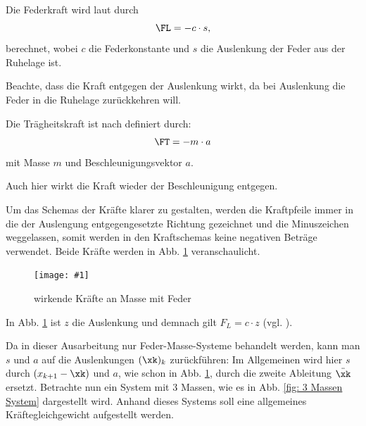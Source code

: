 \documentclass[a4paper,12pt]{report}
\newcommand{\bild}[4]{
      \begin{figure}[!htp]
            \centering
            \texttt{[image: \#1]}
            \caption{#3}
            #4
      \end{figure}
}
\newcommand{\1}{\mathds{1}}
\theoremstyle{plain} %
\theoremstyle{definition} %
\theoremstyle{remark}
\begin{document}
            Die Federkraft \FL wird laut \cite{federkraft} durch
            \begin{equation}
                  \label{eqn: Federkraft}
                  \FL = -c\cdot s,
            \end{equation}
            berechnet, wobei $c$ die Federkonstante und $s$ die Auslenkung der Feder aus der Ruhelage ist.

            Beachte, dass die Kraft entgegen der Auslenkung wirkt, da bei Auslenkung die Feder in die Ruhelage zurückkehren will.
                  
            Die Trägheitskraft \FT ist nach \cite{trägheitskraft} definiert durch:
            \begin{equation}
                  \label{eqn: Trägheitskraft}
                  \FT = -m\cdot a
            \end{equation}
            mit Masse $m$ und Beschleunigungsvektor $a$.    
            
            Auch hier wirkt die Kraft wieder der Beschleunigung entgegen.

            Um das Schemas der Kräfte klarer zu gestalten, werden die Kraftpfeile immer in die der Auslengung entgegengesetzte Richtung gezeichnet und die Minuszeichen weggelassen,
            somit werden in den Kraftschemas keine negativen Beträge verwendet.
            Beide Kräfte werden in Abb. \ref{fig: KräfteAnFeder} veranschaulicht.

            \bild{Federkraft und Trägheitskraft.png}{0.3}{wirkende Kräfte an Masse mit Feder}{\label{fig: KräfteAnFeder}}

            In Abb. \ref{fig: KräfteAnFeder} ist $z$ die Auslenkung und demnach gilt $F_L = c\cdot z$ (vgl. \cite{federkraft}).

            Da in dieser Ausarbeitung nur Feder-Masse-Systeme behandelt werden, kann man $s$ und $a$ auf die Auslenkungen $(\xk)_k$ zurückführen:
            Im Allgemeinen wird hier $s$ durch $(x_{k+1}-\xk)$ und $a$, wie schon in Abb. \ref{fig: KräfteAnFeder}, durch die zweite Ableitung $\ddot \xk$ ersetzt.
            Betrachte nun ein System mit 3 Massen, wie es in Abb. \ref{fig: 3 Massen System} dargestellt wird.
            Anhand dieses Systems soll eine allgemeines Kräftegleichgewicht aufgestellt werden.
\end{document}
